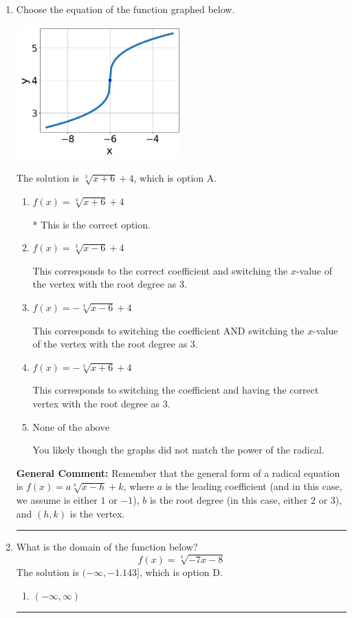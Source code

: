 \documentclass{extbook}[14pt]
\newcommand{\litem}[1]{\item #1

\rule{\textwidth}{0.4pt}}
\begin{document}
\begin{enumerate}\litem{
Choose the equation of the function graphed below.

\begin{center}
    \includegraphics[width=0.5\textwidth]{../Figures/radicalGraphToEquationA.png}
\end{center}


The solution is \( \sqrt[3]{x + 6} + 4 \), which is option A.\begin{enumerate}[label=\Alph*.]
\item \( f(x) = \sqrt[3]{x + 6} + 4 \)

* This is the correct option.
\item \( f(x) = \sqrt[3]{x - 6} + 4 \)

This corresponds to the correct coefficient and switching the $x$-value of the vertex with the root degree as $3$.
\item \( f(x) = - \sqrt[3]{x - 6} + 4 \)

This corresponds to switching the coefficient AND switching the $x$-value of the vertex with the root degree as $3$.
\item \( f(x) = - \sqrt[3]{x + 6} + 4 \)

This corresponds to switching the coefficient and having the correct vertex with the root degree as $3$.
\item \( \text{None of the above} \)

You likely though the graphs did not match the power of the radical.
\end{enumerate}

\textbf{General Comment:} Remember that the general form of a radical equation is $ f(x) = a \sqrt[b]{x - h} + k$, where $a$ is the leading coefficient (and in this case, we assume is either $1$ or $-1$), $b$ is the root degree (in this case, either $2$ or $3$), and $(h, k)$ is the vertex.
}
\litem{
What is the domain of the function below?
\[ f(x) = \sqrt[4]{-7 x - 8} \]The solution is \( (-\infty, -1.143] \), which is option D.\begin{enumerate}[label=\Alph*.]
\item \( (-\infty, \infty) \)


\end{enumerate}}
\end{enumerate}
\end{document}
